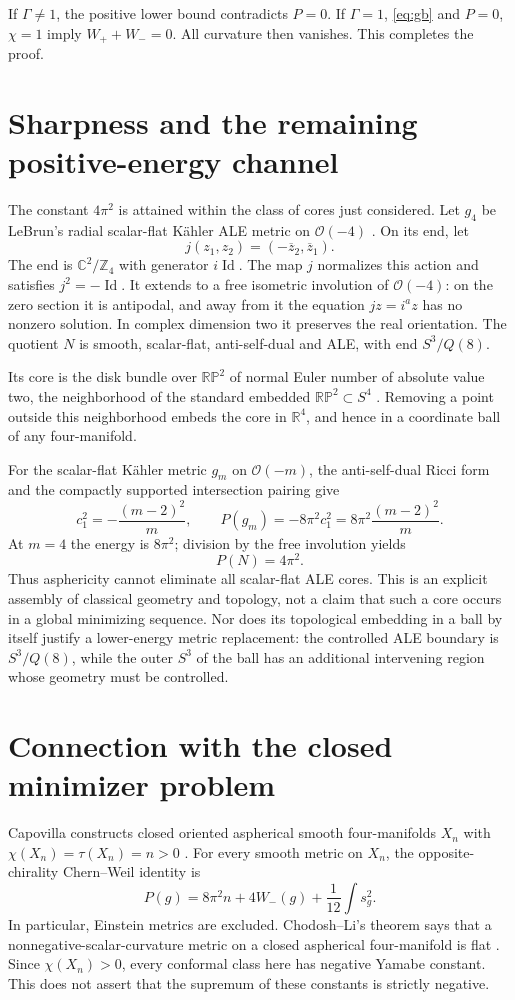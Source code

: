 \documentclass[11pt]{article}
\newcommand{\R}{\mathbb R}
\newcommand{\Z}{\mathbb Z}
\newcommand{\RP}{\mathbb{RP}}
\begin{document}
If $\Gamma\ne1$, the positive lower bound contradicts $P=0$.
If $\Gamma=1$, \eqref{eq:gb} and $P=0$, $\chi=1$ imply
$W_++W_-=0$. All curvature then vanishes. This completes the proof.

\section{Sharpness and the remaining positive-energy channel}
The constant $4\pi^2$ is attained within the class of cores just considered.
Let $g_4$ be LeBrun's radial scalar-flat K\"ahler ALE metric on
$\mathcal O(-4)$ \cite{LeBrun88,Honda}. On its end, let
\[
              j(z_1,z_2)=(-\overline z_2,\overline z_1).
\]
The end is $\mathbb C^2/\Z_4$ with generator $i\operatorname{Id}$.
The map $j$ normalizes this action and satisfies $j^2=-\operatorname{Id}$.
It extends to a free isometric involution of $\mathcal O(-4)$: on the zero
section it is antipodal, and away from it the equation $jz=i^a z$ has no
nonzero solution. In complex dimension two it preserves the real orientation.
The quotient $N$ is smooth, scalar-flat, anti-self-dual and ALE, with end
$S^3/Q(8)$.

Its core is the disk bundle over $\RP^2$ of normal Euler number of absolute
value two, the neighborhood of the standard embedded $\RP^2\subset S^4$
\cite{Hillman,KS}. Removing a point outside this neighborhood embeds the
core in $\R^4$, and hence in a coordinate ball of any four-manifold.

For the scalar-flat K\"ahler metric $g_m$ on $\mathcal O(-m)$, the
anti-self-dual Ricci form and the compactly supported intersection pairing give
\[
 c_1^2=-\frac{(m-2)^2}{m},\qquad
 P(g_m)=-8\pi^2c_1^2=8\pi^2\frac{(m-2)^2}{m}.
\]
At $m=4$ the energy is $8\pi^2$; division by the free involution yields
\[
                                P(N)=4\pi^2.
\]
Thus asphericity cannot eliminate all scalar-flat ALE cores. This is an
explicit assembly of classical geometry and topology, not a claim that such
a core occurs in a global minimizing sequence. Nor does its topological
embedding in a ball by itself justify a lower-energy metric replacement:
the controlled ALE boundary is $S^3/Q(8)$, while the outer $S^3$ of the ball
has an additional intervening region whose geometry must be controlled.

\section{Connection with the closed minimizer problem}
Capovilla constructs closed oriented aspherical smooth four-manifolds $X_n$
with $\chi(X_n)=\tau(X_n)=n>0$ \cite[Theorem 1]{Capovilla}.
For every smooth metric on $X_n$, the opposite-chirality Chern--Weil identity is
\[
                  P(g)=8\pi^2n+4W_-(g)+\frac1{12}\int s_g^2.
\]
In particular, Einstein metrics are excluded. Chodosh--Li's theorem says that
a nonnegative-scalar-curvature metric on a closed aspherical four-manifold is
flat \cite[Theorem 2]{CL}. Since $\chi(X_n)>0$, every conformal class here has
negative Yamabe constant. This does not assert that the supremum of these
constants is strictly negative.
\end{document}
